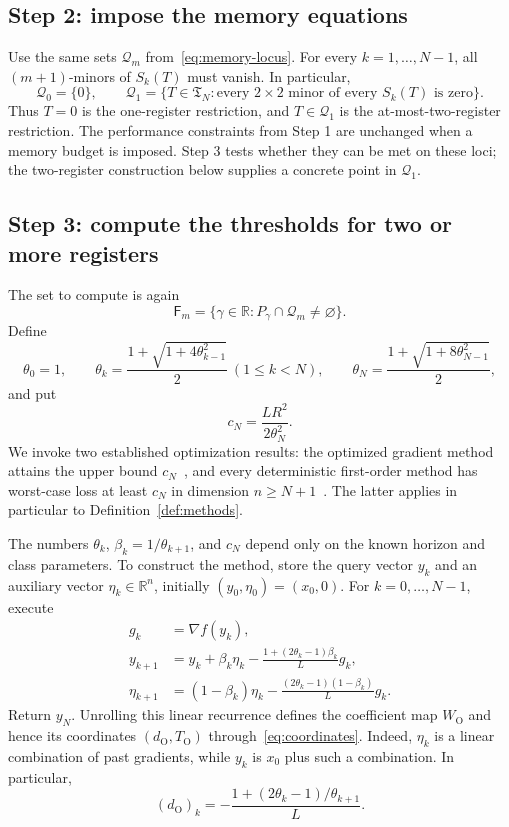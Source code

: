 \documentclass[11pt]{article}
\numberwithin{equation}{section}
\theoremstyle{definition}
\newcommand{\R}{\mathbb R}
\newcommand{\Q}{\mathcal Q}
\begin{document}
\subsection{Step 2: impose the memory equations}
Use the same sets $\Q_m$ from~\eqref{eq:memory-locus}. For every $k=1,\ldots,N-1$, all $(m+1)$-minors of $S_k(T)$ must vanish. In particular,
\[
 \Q_0=\{0\},\qquad
 \Q_1=\{T\in\mathfrak T_N:\text{every }2\times2\text{ minor of every }S_k(T)\text{ is zero}\}.
\]
Thus $T=0$ is the one-register restriction, and $T\in\Q_1$ is the at-most-two-register restriction. The performance constraints from Step 1 are unchanged when a memory budget is imposed. Step 3 tests whether they can be met on these loci; the two-register construction below supplies a concrete point in $\Q_1$.

\subsection{Step 3: compute the thresholds for two or more registers}
The set to compute is again
\[
 \mathsf F_m=\{\gamma\in\R:P_\gamma\cap\Q_m\ne\varnothing\}.
\]
Define
\begin{equation}
 \theta_0=1,\qquad
 \theta_k=\frac{1+\sqrt{1+4\theta_{k-1}^2}}2\ (1\le k<N),\qquad
 \theta_N=\frac{1+\sqrt{1+8\theta_{N-1}^2}}2,
 \label{eq:theta}
\end{equation}
and put
\begin{equation}
 c_N=\frac{LR^2}{2\theta_N^2}.
 \label{eq:smooth-value}
\end{equation}
We invoke two established optimization results: the optimized gradient method attains the upper bound $c_N$~\cite[Theorem 2 and Section 7]{KF}, and every deterministic first-order method has worst-case loss at least $c_N$ in dimension $n\ge N+1$~\cite[Theorem 3 and Corollary 4]{Drori}. The latter applies in particular to Definition~\ref{def:methods}.

The numbers $\theta_k$, $\beta_k=1/\theta_{k+1}$, and $c_N$ depend only on the known horizon and class parameters. To construct the method, store the query vector $y_k$ and an auxiliary vector $\eta_k\in\R^n$, initially $(y_0,\eta_0)=(x_0,0)$. For $k=0,\ldots,N-1$, execute
\begin{align}
 g_k&=\nabla f(y_k),\nonumber\\
 y_{k+1}&=y_k+\beta_k\eta_k
             -\frac{1+(2\theta_k-1)\beta_k}{L}g_k,\label{eq:OGM-state}\\
 \eta_{k+1}&=(1-\beta_k)\eta_k
             -\frac{(2\theta_k-1)(1-\beta_k)}{L}g_k.\nonumber
\end{align}
Return $y_N$. Unrolling this linear recurrence defines the coefficient map $W_{\mathrm O}$ and hence its coordinates $(d_{\mathrm O},T_{\mathrm O})$ through~\eqref{eq:coordinates}. Indeed, $\eta_k$ is a linear combination of past gradients, while $y_k$ is $x_0$ plus such a combination. In particular,
\[
 (d_{\mathrm O})_k
 =-\frac{1+(2\theta_k-1)/\theta_{k+1}}{L}.
\]
\end{document}
